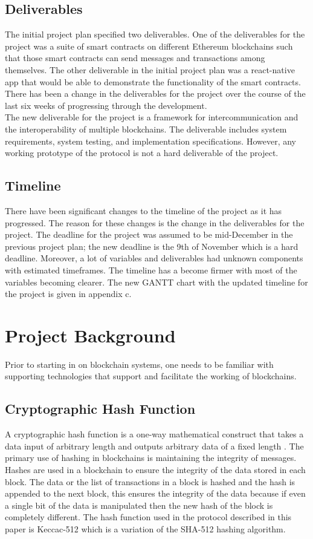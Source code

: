 \documentclass[a4paper,twoside,phd]{BYUPhys}
\begin{document}
\subsection{Deliverables}
The initial project plan specified two deliverables. One of the deliverables for the project was a suite of smart contracts on different Ethereum blockchains such that those smart contracts can send messages and transactions among themselves. The other deliverable in the initial project plan was a react-native app that would be able to demonstrate the functionality of the smart contracts. There has been a change in the deliverables for the project over the course of the last six weeks of progressing through the development. 
\\

The new deliverable for the project is a framework for intercommunication and the interoperability of multiple blockchains. The deliverable includes system requirements, system testing, and implementation specifications. However, any working prototype of the protocol is not a hard deliverable of the project.
\subsection{Timeline}
There have been significant changes to the timeline of the project as it has progressed. The reason for these changes is the change in the deliverables for the project. The deadline for the project was assumed to be mid-December in the previous project plan; the new deadline is the 9th of November which is a hard deadline. Moreover, a lot of variables and deliverables had unknown components with estimated timeframes. The timeline has a become firmer with most of the variables becoming clearer. The new GANTT chart with the updated timeline for the project is given in appendix c.
\section{Project Background}
Prior to starting in on blockchain systems, one needs to be familiar with supporting technologies that support and facilitate the working of blockchains. 
\subsection{Cryptographic Hash Function}
A cryptographic hash function is a one-way mathematical construct that takes a data input of arbitrary length and outputs arbitrary data of a fixed length \cite{PreneelCRYPTOGRAPHICOVERVIEW}. The primary use of hashing in blockchains is maintaining the integrity of messages\cite{2018WhatAcademy}. Hashes are used in a blockchain to ensure the integrity of the data stored in each block. The data or the list of transactions in a block is hashed and the hash is appended to the next block, this ensures the integrity of the data because if even a single bit of the data is manipulated then the new hash of the block is completely different\cite{PreneelCRYPTOGRAPHICOVERVIEW}. The hash function used in the protocol described in this paper is Keccac-512 which is a variation of the SHA-512 hashing algorithm\cite{Bertoni2012KeccakOverview}. 
\end{document}
